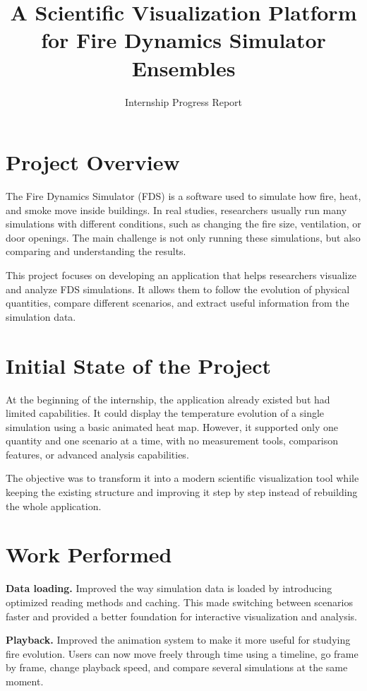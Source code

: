 \documentclass[11pt,a4paper]{article}
\title{\textbf{A Scientific Visualization Platform for Fire Dynamics Simulator Ensembles}}
\author{Internship Progress Report}
\date{}
\begin{document}
\maketitle
\thispagestyle{empty}

\section{Project Overview}

The Fire Dynamics Simulator (FDS) is a software used to simulate how fire, heat, and smoke
move inside buildings. In real studies, researchers usually run many simulations with
different conditions, such as changing the fire size, ventilation, or door openings. The
main challenge is not only running these simulations, but also comparing and understanding
the results.

This project focuses on developing an application that helps researchers visualize and
analyze FDS simulations. It allows them to follow the evolution of physical quantities,
compare different scenarios, and extract useful information from the simulation data.

\section{Initial State of the Project}

At the beginning of the internship, the application already existed but had limited
capabilities. It could display the temperature evolution of a single simulation using a
basic animated heat map. However, it supported only one quantity and one scenario at a time,
with no measurement tools, comparison features, or advanced analysis capabilities.

The objective was to transform it into a modern scientific visualization tool while keeping
the existing structure and improving it step by step instead of rebuilding the whole
application.

\section{Work Performed}

\textbf{Data loading.} Improved the way simulation data is loaded by introducing optimized
reading methods and caching. This made switching between scenarios faster and provided a
better foundation for interactive visualization and analysis.

\textbf{Playback.} Improved the animation system to make it more useful for studying fire
evolution. Users can now move freely through time using a timeline, go frame by frame,
change playback speed, and compare several simulations at the same moment.
\end{document}

